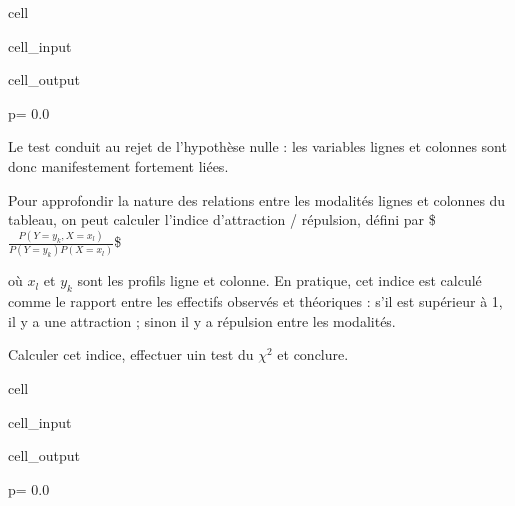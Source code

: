 \documentclass[letterpaper,10pt,french]{sphinxmanual}
\begin{document}
\begin{sphinxuseclass}{cell}
\begin{sphinxuseclass}{cell_input}
\begin{sphinxVerbatim}[commandchars=\\\{\}]
\end{sphinxVerbatim}

\end{sphinxuseclass}
\begin{sphinxuseclass}{cell_output}
\begin{sphinxVerbatim}[commandchars=\\\{\}]
p= 0.0
\end{sphinxVerbatim}

\end{sphinxuseclass}
\end{sphinxuseclass}
\sphinxAtStartPar
Le test conduit au rejet de l’hypothèse nulle : les variables lignes et colonnes sont donc manifestement fortement liées.

\sphinxAtStartPar
Pour approfondir la nature des relations entre les modalités lignes et colonnes du tableau, on peut calculer l’indice d’attraction / répulsion, défini par
\$\(\frac{P(Y=y_k, X=x_l)}{P(Y=y_k)P(X=x_l)}\)\$

\sphinxAtStartPar
où \(x_l\) et \(y_k\) sont les profils ligne et colonne. En pratique, cet indice est calculé comme le rapport entre les effectifs observés et théoriques : s’il est supérieur à 1, il y a une attraction ; sinon il y a répulsion entre les modalités.

\sphinxAtStartPar
Calculer cet indice, effectuer uin test du \(\chi^2\) et conclure.

\begin{sphinxuseclass}{cell}
\begin{sphinxuseclass}{cell_input}
\begin{sphinxVerbatim}[commandchars=\\\{\}]
\end{sphinxVerbatim}

\end{sphinxuseclass}
\begin{sphinxuseclass}{cell_output}
\begin{sphinxVerbatim}[commandchars=\\\{\}]
p= 0.0
\end{sphinxVerbatim}

\end{sphinxuseclass}
\end{sphinxuseclass}
\end{document}

